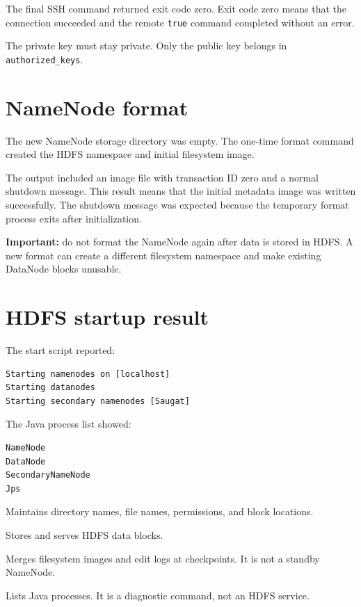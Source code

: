 \documentclass[11pt,a4paper]{article}
\begin{document}
The final SSH command returned exit code zero. Exit code zero means that the connection succeeded and the remote \texttt{true} command completed without an error.

The private key must stay private. Only the public key belongs in \texttt{authorized\_keys}.

\section{NameNode format}

The new NameNode storage directory was empty. The one-time format command created the HDFS namespace and initial filesystem image.

The output included an image file with transaction ID zero and a normal shutdown message. This result means that the initial metadata image was written successfully. The shutdown message was expected because the temporary format process exits after initialization.

\textbf{Important:} do not format the NameNode again after data is stored in HDFS. A new format can create a different filesystem namespace and make existing DataNode blocks unusable.

\section{HDFS startup result}

The start script reported:

\begin{lstlisting}
Starting namenodes on [localhost]
Starting datanodes
Starting secondary namenodes [Saugat]
\end{lstlisting}

The Java process list showed:

\begin{lstlisting}
NameNode
DataNode
SecondaryNameNode
Jps
\end{lstlisting}

\begin{description}[leftmargin=3.6cm,style=nextline]
  \item[NameNode] Maintains directory names, file names, permissions, and block locations.
  \item[DataNode] Stores and serves HDFS data blocks.
  \item[SecondaryNameNode] Merges filesystem images and edit logs at checkpoints. It is not a standby NameNode.
  \item[Jps] Lists Java processes. It is a diagnostic command, not an HDFS service.
\end{description}
\end{document}
